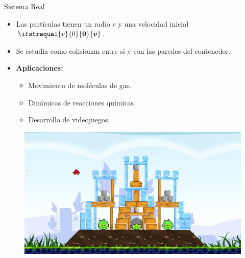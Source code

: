 \documentclass{beamer}
\renewcommand\vec[1]{\ifstrequal{#1}{0}{\ensuremath{\mathbf{0}}}{\ensuremath{\boldsymbol{#1}}}}
\begin{document}
            \begin{frame}{Sistema Real}
                \begin{itemize}
                    \item Las partículas tienen un radio $r$ y una velocidad inicial $\vec{v}$.
                    \item Se estudia como colisionan entre sí y con las paredes del contenedor.
                \end{itemize}
                \begin{minipage}[t]{0.5\textwidth}
                    \begin{itemize}
                        \item \textbf{Aplicaciones:}
                        \begin{itemize}
                            \item Movimiento de moléculas de gas.
                            \item Dinámicas de reacciones químicas.
                            \item Desarrollo de videojuegos.
                        \end{itemize}
                    \end{itemize}
                \end{minipage}
                \hfill
                \begin{minipage}[t]{0.45\textwidth}
                    \begin{figure}[H]
                        \centering
                        \includegraphics[width=\linewidth]{./angrybirds}
                        \label{fig:angry_birds}
                    \end{figure}
                \end{minipage}
            \end{frame}
\end{document}

